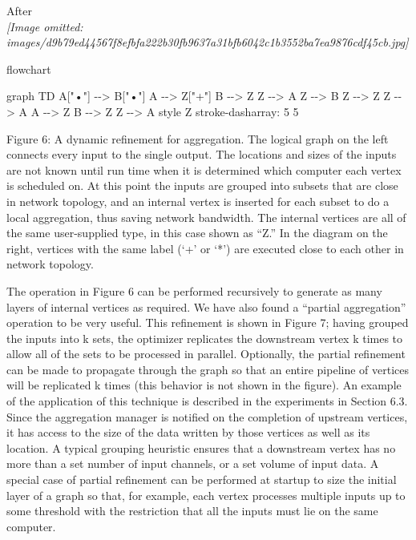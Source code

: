 \documentclass[
]{article}
\newenvironment{Shaded}{}{}
\newcommand{\NormalTok}[1]{#1}
\begin{document}
After\\
\textit{[Image omitted: images/d9b79ed44567f8efbfa222b30fb9637a31bfb6042c1b3552ba7ea9876cdf45cb.jpg]}

flowchart

\begin{Shaded}
\begin{Highlighting}[]
\NormalTok{graph TD}
\NormalTok{    A["•"] {-}{-}\textgreater{} B["•"]}
\NormalTok{    A {-}{-}\textgreater{} Z["+"]}
\NormalTok{    B {-}{-}\textgreater{} Z}
\NormalTok{    Z {-}{-}\textgreater{} A}
\NormalTok{    Z {-}{-}\textgreater{} B}
\NormalTok{    Z {-}{-}\textgreater{} Z}
\NormalTok{    Z {-}{-}\textgreater{} A}
\NormalTok{    A {-}{-}\textgreater{} Z}
\NormalTok{    B {-}{-}\textgreater{} Z}
\NormalTok{    Z {-}{-}\textgreater{} A}
\NormalTok{    style Z stroke{-}dasharray: 5 5}
\end{Highlighting}
\end{Shaded}

Figure 6: A dynamic refinement for aggregation. The logical graph on the
left connects every input to the single output. The locations and sizes
of the inputs are not known until run time when it is determined which
computer each vertex is scheduled on. At this point the inputs are
grouped into subsets that are close in network topology, and an internal
vertex is inserted for each subset to do a local aggregation, thus
saving network bandwidth. The internal vertices are all of the same
user-supplied type, in this case shown as ``Z.'' In the diagram on the
right, vertices with the same label (`+' or `*') are executed close to
each other in network topology.

The operation in Figure 6 can be performed recursively to generate as
many layers of internal vertices as required. We have also found a
``partial aggregation'' operation to be very useful. This refinement is
shown in Figure 7; having grouped the inputs into k sets, the optimizer
replicates the downstream vertex k times to allow all of the sets to be
processed in parallel. Optionally, the partial refinement can be made to
propagate through the graph so that an entire pipeline of vertices will
be replicated k times (this behavior is not shown in the figure). An
example of the application of this technique is described in the
experiments in Section 6.3. Since the aggregation manager is notified on
the completion of upstream vertices, it has access to the size of the
data written by those vertices as well as its location. A typical
grouping heuristic ensures that a downstream vertex has no more than a
set number of input channels, or a set volume of input data. A special
case of partial refinement can be performed at startup to size the
initial layer of a graph so that, for example, each vertex processes
multiple inputs up to some threshold with the restriction that all the
inputs must lie on the same computer.
\end{document}
